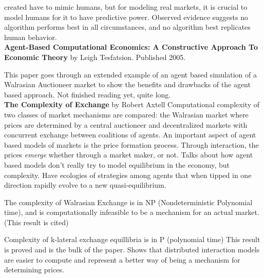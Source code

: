 \documentclass[12pt,twoside]{reedthesis}
\begin{document}
created have to mimic humans, but for modeling real markets, it is crucial to model humans for it to have predictive power. Observed evidence suggests no algorithm performs best in all circumstances, and no algorithm best replicates human behavior. \cite{Tesfatsion2002} \\

\textbf{Agent-Based Computational Economics: A Constructive Approach To Economic Theory} by Leigh Tesfatsion. Published 2005.

This paper goes through an extended example of an agent based simulation of a Walrasian Auctioneer market to show the benefits and drawbacks of the agent based approach. Not finished reading yet, quite long.
\cite{Tesfatsion2005} \\

\textbf{The Complexity of Exchange} by Robert Axtell
Computational complexity of two classes of market mechanisms are compared: the Walrasian market where prices are determined by a central auctioneer and decentralized markets with concurrent exchange between coalitions of agents. An important aspect of agent based models of markets is the price formation process. Through interaction, the prices \textit{emerge} whether through a market maker, or not. Talks about how agent based models don't really try to model equilibrium in the economy, but complexity. Have ecologies of strategies among agents that when tipped in one direction rapidly evolve to a new quasi-equilibrium. 

The complexity of Walrasian Exchange is in NP (Nondeterministic Polynomial time), and is computationally infeasible to be a mechanism for an actual market. (This result is cited)

Complexity of k-lateral exchange equillibria is in P (polynomial time) This result is proved and is the bulk of the paper. Shows that distributed interaction models are easier to compute and represent a better way of being a mechanism for determining prices.
\cite{Axtell2005}\\
\end{document}
